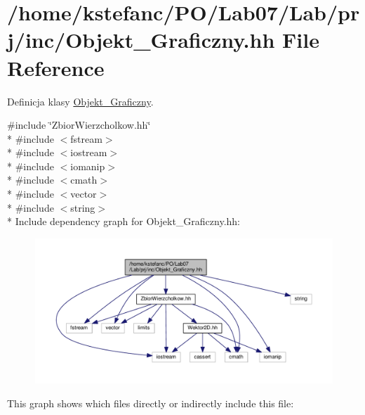 \hypertarget{_objekt___graficzny_8hh}{\section{/home/kstefanc/\+P\+O/\+Lab07/\+Lab/prj/inc/\+Objekt\+\_\+\+Graficzny.hh File Reference}
\label{_objekt___graficzny_8hh}
}


Definicja klasy \hyperlink{class_objekt___graficzny}{Objekt\+\_\+\+Graficzny}.  


{\ttfamily \#include \char`\"{}Zbior\+Wierzcholkow.\+hh\char`\"{}}\\*
{\ttfamily \#include $<$fstream$>$}\\*
{\ttfamily \#include $<$iostream$>$}\\*
{\ttfamily \#include $<$iomanip$>$}\\*
{\ttfamily \#include $<$cmath$>$}\\*
{\ttfamily \#include $<$vector$>$}\\*
{\ttfamily \#include $<$string$>$}\\*
Include dependency graph for Objekt\+\_\+\+Graficzny.\+hh\+:\nopagebreak
\begin{figure}[H]
\begin{center}
\leavevmode
\includegraphics[width=350pt]{_objekt___graficzny_8hh__incl}
\end{center}
\end{figure}
This graph shows which files directly or indirectly include this file\+:\nopagebreak
